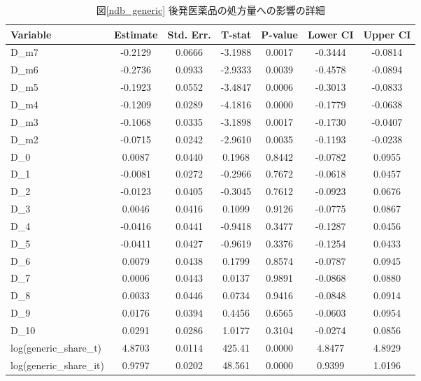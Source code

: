 \documentclass[a4paper,11pt,uplatex]{jsarticle}
\theoremstyle{definition}
\begin{document}
\begin{appendices}
        
    \begin{table}[ht]
    \small 
    \centering
    \caption{図\ref{ndb_generic} 後発医薬品の処方量への影響の詳細}
    \begin{tabular}{lcccccc}
        \hline
        \textbf{Variable} & \textbf{Estimate} & \textbf{Std. Err.} & \textbf{T-stat} & \textbf{P-value} & \textbf{Lower CI} & \textbf{Upper CI} \\
        \hline
        D\_m7 & -0.2129 & 0.0666 & -3.1988 & 0.0017 & -0.3444 & -0.0814 \\
        D\_m6 & -0.2736 & 0.0933 & -2.9333 & 0.0039 & -0.4578 & -0.0894 \\
        D\_m5 & -0.1923 & 0.0552 & -3.4847 & 0.0006 & -0.3013 & -0.0833 \\
        D\_m4 & -0.1209 & 0.0289 & -4.1816 & 0.0000 & -0.1779 & -0.0638 \\
        D\_m3 & -0.1068 & 0.0335 & -3.1898 & 0.0017 & -0.1730 & -0.0407 \\
        D\_m2 & -0.0715 & 0.0242 & -2.9610 & 0.0035 & -0.1193 & -0.0238 \\
        D\_0 & 0.0087 & 0.0440 & 0.1968 & 0.8442 & -0.0782 & 0.0955 \\
        D\_1 & -0.0081 & 0.0272 & -0.2966 & 0.7672 & -0.0618 & 0.0457 \\
        D\_2 & -0.0123 & 0.0405 & -0.3045 & 0.7612 & -0.0923 & 0.0676 \\
        D\_3 & 0.0046 & 0.0416 & 0.1099 & 0.9126 & -0.0775 & 0.0867 \\
        D\_4 & -0.0416 & 0.0441 & -0.9418 & 0.3477 & -0.1287 & 0.0456 \\
        D\_5 & -0.0411 & 0.0427 & -0.9619 & 0.3376 & -0.1254 & 0.0433 \\
        D\_6 & 0.0079 & 0.0438 & 0.1799 & 0.8574 & -0.0787 & 0.0945 \\
        D\_7 & 0.0006 & 0.0443 & 0.0137 & 0.9891 & -0.0868 & 0.0880 \\
        D\_8 & 0.0033 & 0.0446 & 0.0734 & 0.9416 & -0.0848 & 0.0914 \\
        D\_9 & 0.0176 & 0.0394 & 0.4456 & 0.6565 & -0.0603 & 0.0954 \\
        D\_10 & 0.0291 & 0.0286 & 1.0177 & 0.3104 & -0.0274 & 0.0856 \\
        log(generic\_share\_t) & 4.8703 & 0.0114 & 425.41 & 0.0000 & 4.8477 & 4.8929 \\
        log(generic\_share\_it) & 0.9797 & 0.0202 & 48.561 & 0.0000 & 0.9399 & 1.0196 \\
        \hline
        \end{tabular}
        \end{table}
\end{appendices}
\end{document}

